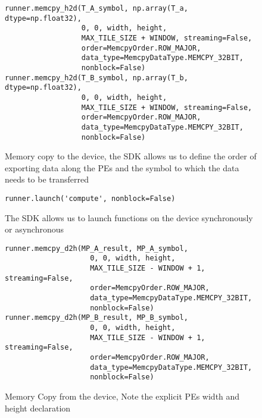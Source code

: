 \begin{figure}[!ht]
    \centering
    \begin{verbatim}
runner.memcpy_h2d(T_A_symbol, np.array(T_a, dtype=np.float32),
                  0, 0, width, height,
                  MAX_TILE_SIZE + WINDOW, streaming=False,
                  order=MemcpyOrder.ROW_MAJOR,
                  data_type=MemcpyDataType.MEMCPY_32BIT,
                  nonblock=False)
runner.memcpy_h2d(T_B_symbol, np.array(T_b, dtype=np.float32),
                  0, 0, width, height,
                  MAX_TILE_SIZE + WINDOW, streaming=False,
                  order=MemcpyOrder.ROW_MAJOR,
                  data_type=MemcpyDataType.MEMCPY_32BIT,
                  nonblock=False)
\end{verbatim}
\caption{Memory copy to the device, the SDK allows us to define the order of exporting data along the PEs and the symbol to which the data needs to be transferred}
\label{code:memcpy_to}
\end{figure}

\begin{figure}[!ht]
    \centering
    \begin{verbatim}
runner.launch('compute', nonblock=False)
\end{verbatim}
\caption{The SDK allows us to launch functions on the device synchronously or asynchronous}
\label{code:call}
\end{figure}

\begin{figure}[!ht]
    \centering
    \begin{verbatim}
runner.memcpy_d2h(MP_A_result, MP_A_symbol,
                    0, 0, width, height,
                    MAX_TILE_SIZE - WINDOW + 1, streaming=False, 
                    order=MemcpyOrder.ROW_MAJOR,
                    data_type=MemcpyDataType.MEMCPY_32BIT,
                    nonblock=False)
runner.memcpy_d2h(MP_B_result, MP_B_symbol,
                    0, 0, width, height,
                    MAX_TILE_SIZE - WINDOW + 1, streaming=False,
                    order=MemcpyOrder.ROW_MAJOR,
                    data_type=MemcpyDataType.MEMCPY_32BIT,
                    nonblock=False)
\end{verbatim}
\caption{Memory Copy from the device, Note the explicit PEs width and height declaration}
\label{code:memcpy_from}
\end{figure}

